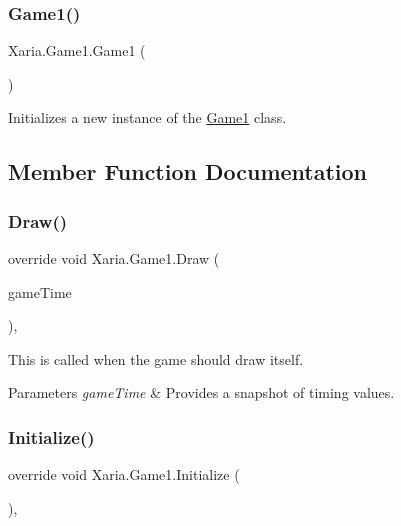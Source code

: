 \subsubsection{\texorpdfstring{Game1()}{Game1()}}
{\footnotesize\ttfamily Xaria.\+Game1.\+Game1 (\begin{DoxyParamCaption}{ }\end{DoxyParamCaption})\hspace{0.3cm}{\ttfamily [inline]}}



Initializes a new instance of the \hyperlink{classXaria_1_1Game1}{Game1} class. 



\subsection{Member Function Documentation}
\mbox{\label{classXaria_1_1Game1_a5dce3a85b3eba6685d04d309bcd6e1c0}} 
\subsubsection{\texorpdfstring{Draw()}{Draw()}}
{\footnotesize\ttfamily override void Xaria.\+Game1.\+Draw (\begin{DoxyParamCaption}\item[{Game\+Time}]{game\+Time }\end{DoxyParamCaption})\hspace{0.3cm}{\ttfamily [inline]}, {\ttfamily [protected]}}



This is called when the game should draw itself. 


\begin{DoxyParams}{Parameters}
{\em game\+Time} & Provides a snapshot of timing values.\\
\hline
\end{DoxyParams}
\mbox{\label{classXaria_1_1Game1_a7510c981afe40f31d24c551b7cc73046}} 
\subsubsection{\texorpdfstring{Initialize()}{Initialize()}}
{\footnotesize\ttfamily override void Xaria.\+Game1.\+Initialize (\begin{DoxyParamCaption}{ }\end{DoxyParamCaption})\hspace{0.3cm}{\ttfamily [inline]}, {\ttfamily [protected]}}



